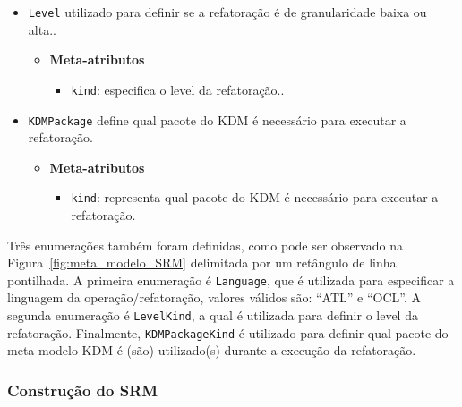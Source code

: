 \begin{itemize}
\item \texttt{Level} utilizado para definir se a refatoração é de granularidade baixa ou alta..

\begin{itemize}
	\item \textbf{Meta-atributos}
		\begin{itemize}
			\item \texttt{kind}: especifica o level da refatoração..
		\end{itemize}	
\end{itemize} 

\item \texttt{KDMPackage} define qual pacote do KDM é necessário para executar a refatoração.

\begin{itemize}
	\item \textbf{Meta-atributos}
		\begin{itemize}
			\item \texttt{kind}: representa qual pacote do KDM é necessário para executar a refatoração.
		\end{itemize}	
\end{itemize} 

\end{itemize}

Três enumerações também foram definidas, como pode ser observado na Figura~\ref{fig:meta_modelo_SRM} delimitada por um retângulo de linha pontilhada. A primeira enumeração é \texttt{Language}, que é utilizada para especificar a linguagem da operação/refatoração, valores válidos são: ``ATL'' e ``OCL''. A segunda enumeração é \texttt{LevelKind}, a qual é utilizada para definir o level da refatoração. Finalmente, \texttt{KDMPackageKind} é utilizado para definir qual pacote do meta-modelo KDM é (são) utilizado(s) durante a execução da refatoração. 



\subsubsection{Construção do SRM}




